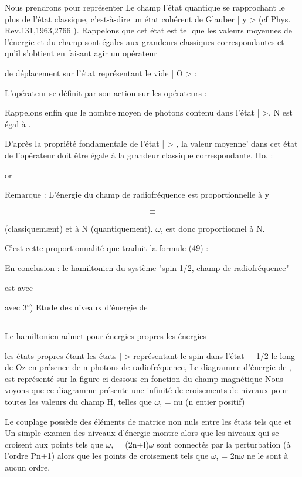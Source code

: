 Nous prendrons pour représenter Le champ l'état quantique se rapprochant le plus de l'état classique, c'est-à-dire un état cohérent de
Glauber | y > (cf Phys. Rev.131,1963,2766 ). Rappelons que cet état est tel
que les valeurs moyennes de l'énergie et du champ sont égales aux grandeurs
classiques correspondantes et qu'il s'obtient en faisant agir un opérateur

de déplacement  sur l'état représentant le vide | O > :

L'opérateur  se définit par son action sur les opérateurs  :

Rappelons enfin que le nombre moyen de photons contenu dans l'état |  >,
N est égal à .

D'après la propriété fondamentale de l'état |  > , la valeur moyenne’ dans cet état de
l'opérateur  doit être égale à la grandeur classique correspondante, Ho, :

or

Remarque : L'énergie du champ de radiofréquence est proportionnelle à y

\[
\tag{50-a}=
\]
\[
\tag{50-b}=
\]

(classiquemænt) et à N (quantiquement). $\omega$, est donc proportionnel à N.

C'est cette proportionnalité que traduit la formule (49) :

En conclusion : le hamiltonien du système "spin 1/2, champ de radiofréquence"

est
avec

avec
3°) Etude des niveaux d'énergie de
\subsection{}%
Le hamiltonien  admet pour énergies propres les énergies

les états propres étant les états |  > représentant le spin dans l'état
+ 1/2 le long de Oz en présence de n photons de radiofréquence,
Le diagramme d'énergie de , est représenté sur la figure ci-dessous en
fonction du champ magnétique 
Nous voyons que ce diagramme présente une infinité de croisements de
niveaux pour toutes les valeurs du champ H, telles que $\omega$, = nu (n entier positif)

Le couplage  possède des éléments de matrice non nuls
entre les états tels que  et Un simple examen des niveaux
d'énergie montre alors que les niveaux qui se croisent aux points tels que
$\omega$, = (2n+l)$\omega$ sont connectés par la perturbation (à l'ordre Pn+1) alors que
les points de croisement tels que $\omega$, = 2n$\omega$ ne le sont à aucun ordre,

